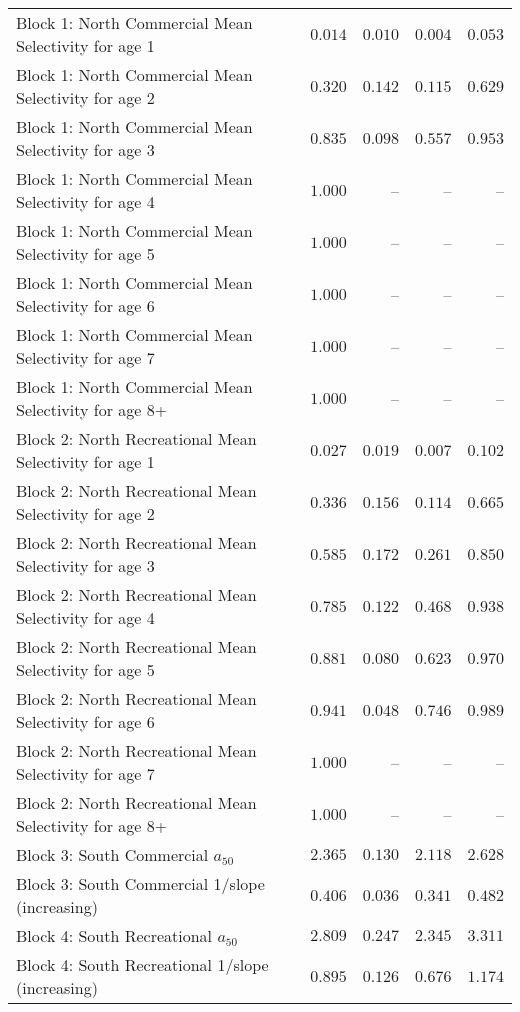 \documentclass[
]{article}
\begin{document}
\begin{landscape}
\begin{longtable}[t]{lrrrr}
Block 1: North Commercial Mean Selectivity for age 1 & $0.014$ & $0.010$ & $0.004$ & $0.053$\\
Block 1: North Commercial Mean Selectivity for age 2 & $0.320$ & $0.142$ & $0.115$ & $0.629$\\
Block 1: North Commercial Mean Selectivity for age 3 & $0.835$ & $0.098$ & $0.557$ & $0.953$\\
Block 1: North Commercial Mean Selectivity for age 4 & $1.000$ & -- & -- & --\\
\addlinespace
Block 1: North Commercial Mean Selectivity for age 5 & $1.000$ & -- & -- & --\\
Block 1: North Commercial Mean Selectivity for age 6 & $1.000$ & -- & -- & --\\
Block 1: North Commercial Mean Selectivity for age 7 & $1.000$ & -- & -- & --\\
Block 1: North Commercial Mean Selectivity for age 8+ & $1.000$ & -- & -- & --\\
Block 2: North Recreational Mean Selectivity for age 1 & $0.027$ & $0.019$ & $0.007$ & $0.102$\\
\addlinespace
Block 2: North Recreational Mean Selectivity for age 2 & $0.336$ & $0.156$ & $0.114$ & $0.665$\\
Block 2: North Recreational Mean Selectivity for age 3 & $0.585$ & $0.172$ & $0.261$ & $0.850$\\
Block 2: North Recreational Mean Selectivity for age 4 & $0.785$ & $0.122$ & $0.468$ & $0.938$\\
Block 2: North Recreational Mean Selectivity for age 5 & $0.881$ & $0.080$ & $0.623$ & $0.970$\\
Block 2: North Recreational Mean Selectivity for age 6 & $0.941$ & $0.048$ & $0.746$ & $0.989$\\
\addlinespace
Block 2: North Recreational Mean Selectivity for age 7 & $1.000$ & -- & -- & --\\
Block 2: North Recreational Mean Selectivity for age 8+ & $1.000$ & -- & -- & --\\
Block 3: South Commercial $a_{50}$ & $2.365$ & $0.130$ & $2.118$ & $2.628$\\
Block 3: South Commercial 1/slope (increasing) & $0.406$ & $0.036$ & $0.341$ & $0.482$\\
Block 4: South Recreational $a_{50}$ & $2.809$ & $0.247$ & $2.345$ & $3.311$\\
\addlinespace
Block 4: South Recreational 1/slope (increasing) & $0.895$ & $0.126$ & $0.676$ & $1.174$\\

\end{longtable}
\end{landscape}
\end{document}
